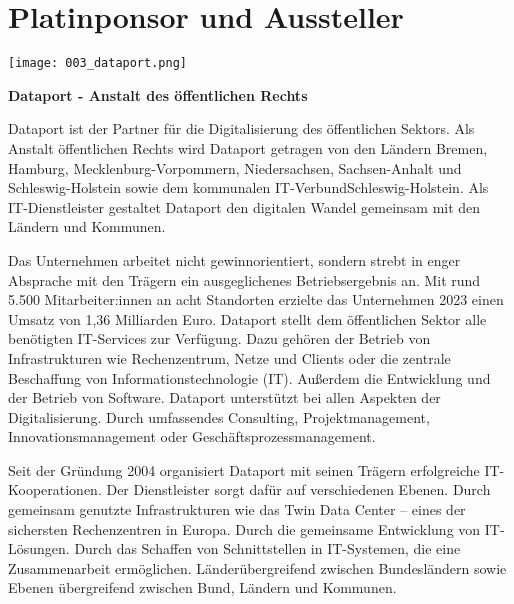 \clearpage
\section*{Platinponsor und Aussteller}
  \texttt{[image: 003\_dataport.png]}
  \vspace{1.0\baselineskip}
  
\noindent
    {\bfseries Dataport - Anstalt des öffentlichen Rechts}
    \vspace{1.0\baselineskip}
    
\noindent
Dataport ist der Partner für die Digitalisierung des öffentlichen Sektors.
Als Anstalt öffentlichen Rechts wird Dataport getragen von den Ländern Bremen,
Hamburg, Mecklenburg-Vorpommern, Niedersachsen, Sachsen-Anhalt und
Schleswig-Holstein sowie dem kommunalen IT-Verbund\linebreak Schleswig-Holstein.
Als IT-Dienst\-leister gestaltet Dataport den digitalen Wandel gemeinsam mit
den Ländern und Kommunen.

\noindent
Das Unternehmen arbeitet nicht gewinnorientiert, sondern strebt in enger
Absprache mit den Trägern ein ausgeglichenes Betriebsergebnis an.
Mit rund 5.500 Mitarbeiter:innen an acht Standorten erzielte das Unternehmen
2023 einen Umsatz von 1,36 Milliarden Euro. Dataport stellt dem öffentlichen
Sektor alle benötigten IT-Services zur Verfügung. Dazu gehören der Betrieb
von Infrastrukturen wie Rechenzentrum, Netze und Clients oder die zentrale
Beschaffung von Informationstechnologie (IT). Außerdem die Entwicklung und
der Betrieb von Software. Dataport unterstützt bei allen Aspekten der Digitalisierung.
Durch umfassendes Consulting, Projektmanagement, Innovationsmanagement
oder Geschäftsprozessmanagement.

\newpage
\noindent
Seit der Gründung 2004 organisiert Dataport mit seinen Trägern erfolgreiche
IT-Kooperationen. Der Dienstleister sorgt dafür auf verschiedenen Ebenen.
Durch gemeinsam genutzte Infrastrukturen wie das Twin Data Center – eines
der sichersten Rechenzentren in Europa. Durch die gemeinsame Entwicklung
von IT-Lösungen. Durch das Schaffen von Schnittstellen in IT-Systemen, die
eine Zusammenarbeit ermöglichen. Länderübergreifend zwischen Bundesländern
sowie Ebenen übergreifend zwischen Bund, Ländern und Kommunen.

